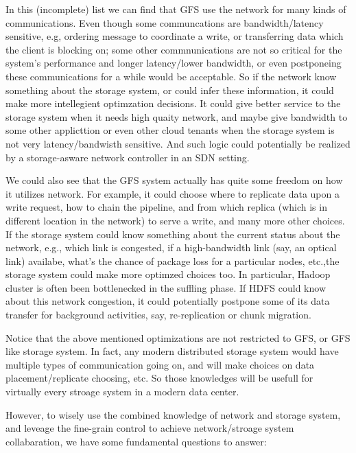 In this (incomplete) list we can find that GFS use the network for many kinds of communications. Even though some communcations are bandwidth/latency sensitive, e.g, ordering message to coordinate a write, or transferring data which the client is blocking on; some other commnunications are not so critical for the system's performance and longer latency/lower bandwidth, or even postponeing these communications for a while would be acceptable. So if the network know something about the storage system, or could infer these information, it could make more intellegient optimzation decisions. It could give better service to the storage system when it needs high quaity network, and maybe give bandwidth to some other applicttion or even other cloud tenants when the storage system is not very latency/bandwisth sensitive.  And such logic could potentially be realized by a storage-asware network controller in an SDN setting. 

We could also see that the GFS system actually has quite some freedom on how it utilizes network. For example, it could choose where to replicate data upon a write request, how to chain the pipeline, and from which replica (which is in different location in the network) to serve a write, and many more other choices. If the storage system could know something about the current status about the network, e.g., which link is congested, if a high-bandwidth link (say, an optical link) availabe, what's the chance of package loss for a particular nodes, etc.,the storage system could make more optimzed choices too. In particular, Hadoop cluster is often been bottlenecked in the suffling phase. If HDFS could know about this network congestion, it could potentially postpone some of its data transfer for background activities, say, re-replication or chunk migration.

Notice that the above mentioned optimizations are not restricted to GFS, or GFS like storage system. In fact, any modern distributed storage system would have multiple types of communication going on, and will make choices on data placement/replicate choosing, etc. So those knowledges will be usefull for virtually every stroage system in a modern data center.

However, to wisely use the combined knowledge of network and storage system, and leveage the fine-grain control to achieve network/stroage system collabaration, we have some fundamental questions to answer:

